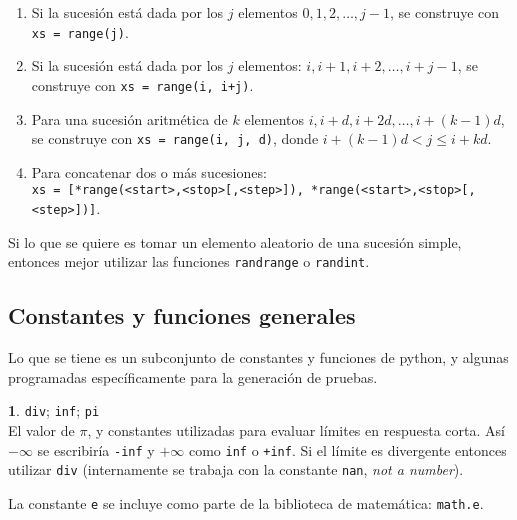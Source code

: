 \documentclass[12pt]{article}
\theoremstyle{definition}
\newtheorem{funcion}{}[section]
\begin{document}
\begin{enumerate}
  \item Si la sucesión está dada por los $j$ elementos $0, 1, 2, \dots, j - 1$, se construye con \verb|xs = range(j)|.
  \item Si la sucesión está dada por los $j$ elementos: $i, i+1, i+2, \dots, i + j - 1$, se construye con \verb|xs = range(i, i+j)|.
  \item Para una sucesión aritmética de $k$ elementos $i, i + d, i + 2d, \dots, i + (k-1)d$, se construye con \verb|xs = range(i, j, d)|, donde $i + (k-1)d < j \leq i + kd$.
  \item Para concatenar dos o más sucesiones:\\[1ex]
    \verb|xs = [*range(<start>,<stop>[,<step>]), *range(<start>,<stop>[,<step>])]|.
\end{enumerate}

Si lo que se quiere es tomar un elemento aleatorio de una sucesión simple, entonces mejor utilizar las funciones \verb|randrange| o \verb|randint|. 

\subsection{Constantes y funciones generales}
Lo que se tiene es un subconjunto de constantes y funciones de python, y algunas programadas específicamente para la generación de pruebas.

\begin{funcion}
\verb|div|; \verb|inf|; \verb|pi| \\[1ex]
  El valor de $\pi$, y constantes utilizadas para evaluar límites en respuesta corta. Así $-\infty$ se escribiría \verb|-inf| y $+\infty$ como \verb|inf| o \verb|+inf|. Si el límite es divergente entonces utilizar \verb|div| (internamente se trabaja con la constante \verb|nan|, \emph{not a number}).

  La constante \verb|e| se incluye como parte de la biblioteca de matemática: \verb|math.e|.
\end{funcion}
\end{document}
